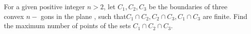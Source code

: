 For  a given positive integer $n >2$,  let $C_{1},C_{2},C_{3}$ be the boundaries of three convex $n-$ gons in the plane , such that$C_{1}\cap C_{2}, C_{2}\cap C_{3},C_{1}\cap C_{3}$ are finite. Find the maximum number of points of the sets $C_{1}\cap C_{2}\cap C_{3}$.